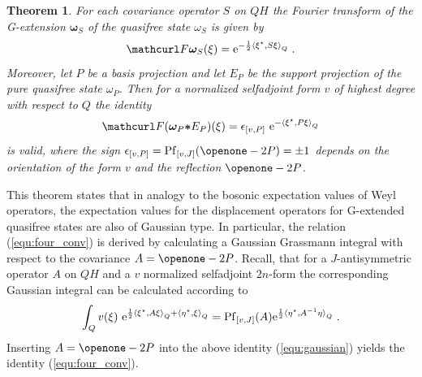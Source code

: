 \documentclass[pra,twoside,amsmath,amsfonts,amssymb,superscriptaddress,showpacs]{revtex4}
\newtheorem{thm}{Theorem}
\def\8#1{{\rm #1}}
\def\9#1{{\mathcurl #1}}
\def\bS#1{{\boldsymbol #1}}
\def\I{\openone}
\newcommand{\RIGG}[3]{{\langle}{#1},{#2}{\rangle}_{#3}}
\newcommand{\FOUR}{{\9F}}
\newcommand{\CON}{{\bS\ast}}
\newcommand{\ADJ}{\star}
\begin{document}
\begin{thm}
\label{thm:g-extension}
For each covariance operator $S$ on $QH$ the Fourier transform of the G-extension $\bS\omega_S$ of
the quasifree state $\omega_S$ is given by 
\begin{equation}
\label{eq:char}
\FOUR{\boldsymbol\omega}_S(\xi)=\8e^{-\frac{1}{2}\RIGG{\xi^\ADJ}{S\xi}{Q}} \; .
\end{equation}
Moreover, let $P$ be a basis projection and let $E_P$ be
the support projection of the pure quasifree state $\omega_P$. Then for a normalized selfadjoint
form $v$ of highest degree with respect to $Q$ the identity
\begin{equation}
\label{equ:four_conv}
\FOUR(\bS\omega_P\CON E_P)(\xi)=\epsilon_{[v,P]} \ \8e^{-\RIGG{\xi^\ADJ}{P\xi}{Q}}
\end{equation}
is valid, where the sign $\epsilon_{[v,P]}=\8{Pf}_{[v,J]}(\I-2P)=\pm 1$ depends on the 
orientation of the form $v$ and the reflection $\I-2P$.
\end{thm}

This theorem states that in analogy to the bosonic expectation values of Weyl operators, the
expectation values for the displacement operators for G-extended quasifree states are also of
Gaussian type. In particular, the relation (\ref{equ:four_conv}) is derived by calculating a
Gaussian Grassmann integral with respect to the covariance $A=\I-2P$. Recall, that for a
$J$-antisymmetric operator $A$ on $QH$ and a $v$ normalized selfadjoint $2n$-form the corresponding 
Gaussian integral can be calculated according to
\begin{equation}
\label{equ:gaussian}
\int_Qv(\xi) \ \8e^{\frac{1}{2}
\RIGG{\xi^\ADJ}{A\xi}{Q}+\RIGG{\eta^\ADJ}{\xi}{Q}}=
\8{Pf}_{[v,J]}(A)\8e^{\frac{1}{2}\RIGG{\eta^\ADJ}{A^{-1}\eta}{Q}} \; .
\end{equation}
Inserting $A=\I-2P$ into the above identity (\ref{equ:gaussian}) yields the identity
(\ref{equ:four_conv}).

\end{document}
